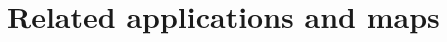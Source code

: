 



%

  \section{Related applications and maps}
    \label{sec:overv:applc}


%
%
%
%
%
%
%
%
%
%




